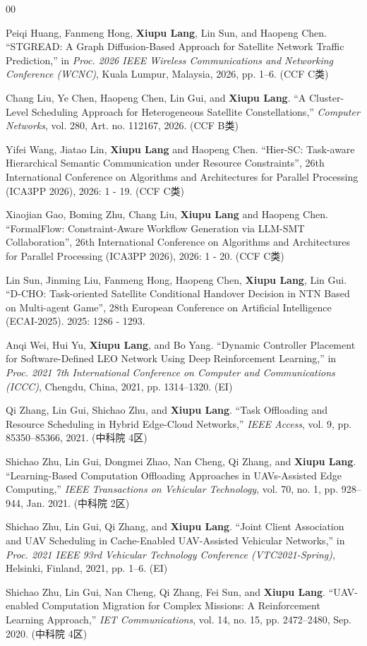 \begin{achievements}
\begin{bibliolist}{00}
  \item Peiqi Huang, Fanmeng Hong, \textbf{Xiupu Lang}, Lin Sun, and Haopeng Chen. ``STGREAD: A Graph Diffusion-Based Approach for Satellite Network Traffic Prediction,'' in \textit{Proc. 2026 IEEE Wireless Communications and Networking Conference (WCNC)}, Kuala Lumpur, Malaysia, 2026, pp. 1--6. (CCF C类)
  \item Chang Liu, Ye Chen, Haopeng Chen, Lin Gui, and \textbf{Xiupu Lang}. ``A Cluster-Level Scheduling Approach for Heterogeneous Satellite Constellations,'' \textit{Computer Networks}, vol. 280, Art. no. 112167, 2026. (CCF B类)
  \item Yifei Wang, Jiatao Lin,  \textbf{Xiupu Lang} and  Haopeng Chen. ``Hier-SC: Task-aware Hierarchical Semantic Communication under Resource Constraints'', 26th International Conference on Algorithms and Architectures for Parallel Processing (ICA3PP 2026), 2026: 1 - 19. (CCF C类)
  \item Xiaojian Gao, Boming Zhu, Chang Liu,  \textbf{Xiupu Lang} and  Haopeng Chen. ``FormalFlow: Constraint-Aware Workflow Generation via LLM-SMT Collaboration'', 26th International Conference on Algorithms and Architectures for Parallel Processing (ICA3PP 2026), 2026: 1 - 20. (CCF C类)
  \item Lin Sun, Jinming Liu, Fanmeng Hong, Haopeng Chen, \textbf{Xiupu Lang}, Lin Gui. ``D-CHO: Task-oriented Satellite Conditional Handover Decision in NTN Based on Multi-agent Game'', 28th European Conference on Artificial Intelligence (ECAI-2025). 2025: 1286 - 1293.
  \item Anqi Wei, Hui Yu, \textbf{Xiupu Lang}, and Bo Yang. ``Dynamic Controller Placement for Software-Defined LEO Network Using Deep Reinforcement Learning,'' in \textit{Proc. 2021 7th International Conference on Computer and Communications (ICCC)}, Chengdu, China, 2021, pp. 1314--1320. (EI)
  \item Qi Zhang, Lin Gui, Shichao Zhu, and \textbf{Xiupu Lang}. ``Task Offloading and Resource Scheduling in Hybrid Edge-Cloud Networks,'' \textit{IEEE Access}, vol. 9, pp. 85350--85366, 2021. (中科院 4区)
  \item Shichao Zhu, Lin Gui, Dongmei Zhao, Nan Cheng, Qi Zhang, and \textbf{Xiupu Lang}. ``Learning-Based Computation Offloading Approaches in UAVs-Assisted Edge Computing,'' \textit{IEEE Transactions on Vehicular Technology}, vol. 70, no. 1, pp. 928--944, Jan. 2021. (中科院 2区)
  \item Shichao Zhu, Lin Gui, Qi Zhang, and \textbf{Xiupu Lang}. ``Joint Client Association and UAV Scheduling in Cache-Enabled UAV-Assisted Vehicular Networks,'' in \textit{Proc. 2021 IEEE 93rd Vehicular Technology Conference (VTC2021-Spring)}, Helsinki, Finland, 2021, pp. 1--6. (EI)
  \item Shichao Zhu, Lin Gui, Nan Cheng, Qi Zhang, Fei Sun, and \textbf{Xiupu Lang}. ``UAV-enabled Computation Migration for Complex Missions: A Reinforcement Learning Approach,'' \textit{IET Communications}, vol. 14, no. 15, pp. 2472--2480, Sep. 2020. (中科院 4区)
\end{bibliolist}


\end{achievements}

